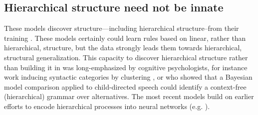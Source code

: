 \documentclass[output=paper,colorlinks,citecolor=brown
]{langscibook}
\begin{document}
\subsection*{Hierarchical structure need not be innate}

These models discover structure---including hierarchical structure--from their training \citep{hewitt2019structural,manning2020emergent,lin2019open,tenney2019you,warstadt2020can,kim2020pre,linzen2021syntactic,mahowald2023dissociating}. These models certainly could learn rules based on linear, rather than hierarchical, structure, but the data strongly leads them towards hierarchical, structural generalization. This capacity to discover hierarchical structure rather than building it in was long-emphasized by cognitive psychologists, for instance work inducing syntactic categories by clustering \citep{redington1998distributional,clark2000inducing}, or \cite{perfors2011learnability} who showed that a Bayesian model comparison applied to child-directed speech could identify a context-free (hierarchical) grammar over alternatives.  The most recent models build on earlier efforts to encode hierarchical processes into neural networks (e.g. \cite{tabor1997parsing,christiansen1999toward,tabor2000fractal,smolensky2006harmonic}).  
\end{document}
